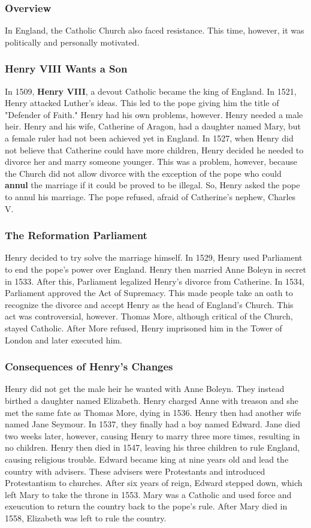 \documentclass[11pt]{article}
\begin{document}
\subsubsection{Overview}
\label{sec:orgd7b22d7}
In England, the Catholic Church also faced resistance. This time, however, it was politically and personally motivated.
\subsubsection{Henry VIII Wants a Son}
\label{sec:orgcc0dacb}
In 1509, \textbf{Henry VIII}, a devout Catholic became the king of England. In 1521, Henry attacked Luther's ideas. This led to the pope giving him the title of "Defender of Faith." Henry had his own problems, however. Henry needed a male heir. Henry and his wife, Catherine of Aragon, had a daughter named Mary, but a female ruler had not been achieved yet in England. In 1527, when Henry did not believe that Catherine could have more children, Henry decided he needed to divorce her and marry someone younger. This was a problem, however, because the Church did not allow divorce with the exception of the pope who could \textbf{annul} the marriage if it could be proved to be illegal. So, Henry asked the pope to annul his marriage. The pope refused, afraid of Catherine's nephew, Charles V.
\subsubsection{The Reformation Parliament}
\label{sec:orgf4853ef}
Henry decided to try solve the marriage himself. In 1529, Henry used Parliament to end the pope's power over England. Henry then married Anne Boleyn in secret in 1533. After this, Parliament legalized Henry's divorce from Catherine. In 1534, Parliament approved the Act of Supremacy. This made people take an oath to recognize the divorce and accept Henry as the head of England's Church. This act was controversial, however. Thomas More, although critical of the Church, stayed Catholic. After More refused, Henry imprisoned him in the Tower of London and later executed him.
\subsubsection{Consequences of Henry's Changes}
\label{sec:org3001a58}
Henry did not get the male heir he wanted with Anne Boleyn. They instead birthed a daughter named Elizabeth. Henry charged Anne with treason and she met the same fate as Thomas More, dying in 1536. Henry then had another wife named Jane Seymour. In 1537, they finally had a boy named Edward. Jane died two weeks later, however, causing Henry to marry three more times, resulting in no children. Henry then died in 1547, leaving his three children to rule England, causing religious trouble. Edward became king at nine years old and lead the country with advisers. These advisers were Protestants and introduced Protestantism to churches. After six years of reign, Edward stepped down, which left Mary to take the throne in 1553. Mary was a Catholic and used force and exeucution to return the country back to the pope's rule. After Mary died in 1558, Elizabeth was left to rule the country.
\end{document}
